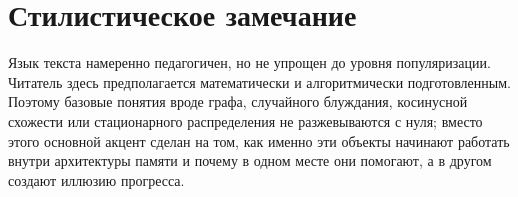 \section*{Стилистическое замечание}

Язык текста намеренно педагогичен, но не упрощен до уровня популяризации.
Читатель здесь предполагается математически и алгоритмически подготовленным.
Поэтому базовые понятия вроде графа, случайного блуждания, косинусной
схожести или стационарного распределения не разжевываются с нуля; вместо этого
основной акцент сделан на том, как именно эти объекты начинают работать внутри
архитектуры памяти и почему в одном месте они помогают, а в другом создают
иллюзию прогресса.
